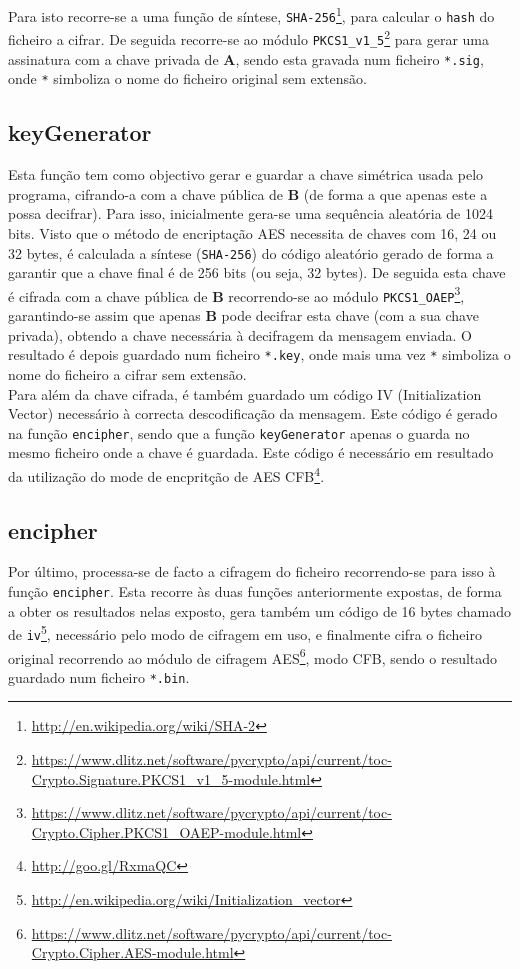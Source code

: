 \documentclass[a4paper,11pt,openright,oneside]{report}
\begin{document}
Para isto recorre-se a uma função de síntese, \verb|SHA-256|\footnote{\url{http://en.wikipedia.org/wiki/SHA-2}}, para calcular o \verb|hash| do ficheiro a cifrar. De seguida recorre-se ao módulo \verb|PKCS1_v1_5|\footnote{\url{https://www.dlitz.net/software/pycrypto/api/current/toc-Crypto.Signature.PKCS1_v1_5-module.html}} para gerar uma assinatura com a chave privada de \textbf{A}, sendo esta gravada num ficheiro \verb|*.sig|, onde \verb|*| simboliza o nome do ficheiro original sem extensão.

\subsection{keyGenerator}

Esta função tem como objectivo gerar e guardar a chave simétrica usada pelo programa, cifrando-a com a chave pública de \textbf{B} (de forma a que apenas este a possa decifrar). Para isso, inicialmente gera-se uma sequência aleatória de 1024 bits. Visto que o método de encriptação AES necessita de chaves com 16, 24 ou 32 bytes, é calculada a síntese (\verb|SHA-256|) do código aleatório gerado de forma a garantir que a chave final é de 256 bits (ou seja, 32 bytes). De seguida esta chave é cifrada com a chave pública de \textbf{B} recorrendo-se ao módulo \verb|PKCS1_OAEP|\footnote{\url{https://www.dlitz.net/software/pycrypto/api/current/toc-Crypto.Cipher.PKCS1_OAEP-module.html}}, garantindo-se assim que apenas \textbf{B} pode decifrar esta chave (com a sua chave privada), obtendo a chave necessária à decifragem da mensagem enviada. O resultado é depois guardado num ficheiro \verb|*.key|, onde mais uma vez \verb|*| simboliza o nome do ficheiro a cifrar sem extensão.\\

Para além da chave cifrada, é também guardado um código IV (Initialization Vector) necessário à correcta descodificação da mensagem. Este código é gerado na função \verb|encipher|, sendo que a função \verb|keyGenerator| apenas o guarda no mesmo ficheiro onde a chave é guardada. Este código é necessário em resultado da utilização do mode de encpritção de AES CFB\footnote{\url{http://goo.gl/RxmaQC}}.

\subsection{encipher}

Por último, processa-se de facto a cifragem do ficheiro recorrendo-se para isso à função \verb|encipher|. Esta recorre às duas funções anteriormente expostas, de forma a obter os resultados nelas exposto, gera também um código de 16 bytes chamado de \verb|iv|\footnote{\url{http://en.wikipedia.org/wiki/Initialization_vector}}, necessário pelo modo de cifragem em uso, e finalmente cifra o ficheiro original recorrendo ao módulo de cifragem AES\footnote{\url{https://www.dlitz.net/software/pycrypto/api/current/toc-Crypto.Cipher.AES-module.html}}, modo CFB, sendo o resultado guardado num ficheiro \verb|*.bin|.\\
\end{document}
